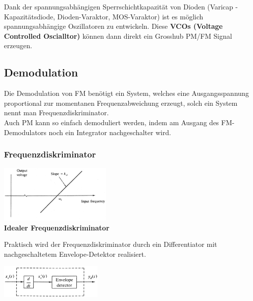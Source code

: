 Dank der spannungsabhängigen Sperrschichtkapazität von Dioden (Varicap - Kapazitätsdiode,
Dioden-Varaktor, MOS-Varaktor) ist es möglich spannungsabhängige Oszillatoren zu entwickeln. Diese \textbf{VCOs
(Voltage Controlled Oscialltor)} können dann direkt ein Grosshub PM/FM Signal
erzeugen.\\


\subsection{Demodulation}
Die Demodulation von FM benötigt ein System, welches eine Ausgangsspannung proportional zur
momentanen Frequenzabweichung erzeugt, solch ein System nennt man Frequenzdiskriminator. \\
Auch PM kann so einfach demoduliert werden, indem am Ausgang des FM-Demodulators noch ein
Integrator nachgeschalter wird.

\subsubsection{Frequenzdiskriminator}
\begin{minipage}[t][3cm][c]{6cm}	
	\begin{center}
  		\includegraphics[height=2.8cm]{bilder/fm_pm_frequenzdiskriminatorAmplitudengang.png} \\
  		\textbf{Idealer Frequenzdiskriminator}
	\end{center}
\end{minipage}
\begin{minipage}[t][3cm][c]{6cm} 
	Praktisch wird der Frequenzdiskriminator durch ein Differentiator mit nachgeschaltetem
	Envelope-Detektor realisiert.
\end{minipage}
\begin{minipage}[t][3cm][c]{6cm} 
	\begin{center}
		\includegraphics[width=5cm]{bilder/fm_pm_frequenzdiskriminatorRealisierung.png} \\ 
	\end{center}
\end{minipage}

